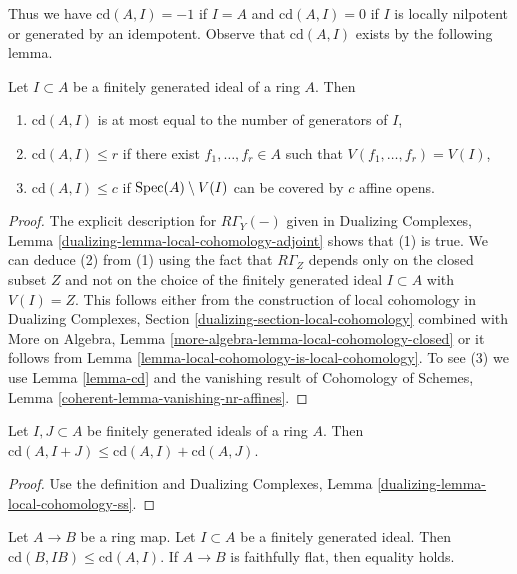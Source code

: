 \noindent
Thus we have $\text{cd}(A, I) = -1$ if
$I = A$ and $\text{cd}(A, I) = 0$ if $I$ is locally nilpotent
or generated by an idempotent.
Observe that $\text{cd}(A, I)$ exists by the following lemma.

\begin{lemma}
\label{lemma-bound-cd}
Let $I \subset A$ be a finitely generated ideal of a ring $A$.
Then
\begin{enumerate}
\item $\text{cd}(A, I)$ is at most equal to the number of
generators of $I$,
\item $\text{cd}(A, I) \leq r$ if there exist $f_1, \ldots, f_r \in A$
such that $V(f_1, \ldots, f_r) = V(I)$,
\item $\text{cd}(A, I) \leq c$ if $\mathop{\mathrm{Spec}}(A) \setminus V(I)$
can be covered by $c$ affine opens.
\end{enumerate}
\end{lemma}

\begin{proof}
The explicit description for $R\Gamma_Y(-)$ given in
Dualizing Complexes, Lemma \ref{dualizing-lemma-local-cohomology-adjoint}
shows that (1) is true. We can deduce (2) from (1) using the
fact that $R\Gamma_Z$ depends only on the closed subset
$Z$ and not on the choice of the finitely generated ideal
$I \subset A$ with $V(I) = Z$. This follows either from the
construction of local cohomology in
Dualizing Complexes, Section \ref{dualizing-section-local-cohomology}
combined with
More on Algebra, Lemma \ref{more-algebra-lemma-local-cohomology-closed}
or it follows from Lemma \ref{lemma-local-cohomology-is-local-cohomology}.
To see (3) we use Lemma \ref{lemma-cd}
and the vanishing result of Cohomology of Schemes, Lemma
\ref{coherent-lemma-vanishing-nr-affines}.
\end{proof}

\begin{lemma}
\label{lemma-cd-sum}
Let $I, J \subset A$ be finitely generated ideals of a ring $A$.
Then $\text{cd}(A, I + J) \leq \text{cd}(A, I) + \text{cd}(A, J)$.
\end{lemma}

\begin{proof}
Use the definition and Dualizing Complexes, Lemma
\ref{dualizing-lemma-local-cohomology-ss}.
\end{proof}

\begin{lemma}
\label{lemma-cd-change-rings}
Let $A \to B$ be a ring map. Let $I \subset A$ be a finitely generated ideal.
Then $\text{cd}(B, IB) \leq \text{cd}(A, I)$. If $A \to B$ is faithfully
flat, then equality holds.
\end{lemma}

